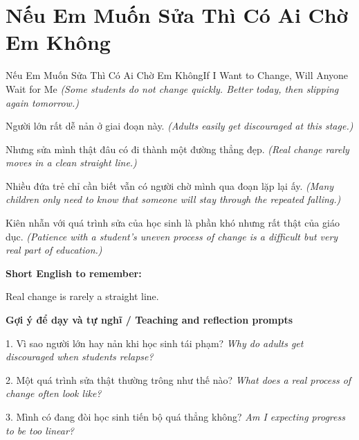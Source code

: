 \section{Nếu Em Muốn Sửa Thì Có Ai Chờ Em Không}
\begin{truyen}{Nếu Em Muốn Sửa Thì Có Ai Chờ Em Không}{If I Want to Change, Will Anyone Wait for Me}
\textit{(Some students do not change quickly. Better today, then slipping again tomorrow.)}

Người lớn rất dễ nản ở giai đoạn này.
\textit{(Adults easily get discouraged at this stage.)}

Nhưng sửa mình thật đâu có đi thành một đường thẳng đẹp.
\textit{(Real change rarely moves in a clean straight line.)}

Nhiều đứa trẻ chỉ cần biết vẫn có người chờ mình qua đoạn lặp lại ấy.
\textit{(Many children only need to know that someone will stay through the repeated falling.)}

\end{truyen}

\begin{baihoc}
Kiên nhẫn với quá trình sửa của học sinh là phần khó nhưng rất thật của giáo dục.
\textit{(Patience with a student's uneven process of change is a difficult but very real part of education.)}
\end{baihoc}

\begin{ghinhoanh}
\textbf{Short English to remember:}

Real change is rarely a straight line.

\end{ghinhoanh}

\begin{tuhocnhanh}
\textbf{Gợi ý để dạy và tự nghĩ / Teaching and reflection prompts}

1. Vì sao người lớn hay nản khi học sinh tái phạm? \textit{Why do adults get discouraged when students relapse?}

2. Một quá trình sửa thật thường trông như thế nào? \textit{What does a real process of change often look like?}

3. Mình có đang đòi học sinh tiến bộ quá thẳng không? \textit{Am I expecting progress to be too linear?}
\end{tuhocnhanh}
\ngancach

